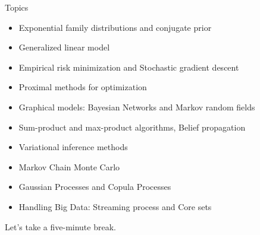 \documentclass{beamer}
\begin{document}


\begin{frame}{Topics}
\begin{itemize}
    \item Exponential family distributions and conjugate prior
    \item Generalized linear model
    \item Empirical risk minimization and Stochastic gradient descent 
    \item Proximal methods for optimization
    \item Graphical models: Bayesian Networks and Markov random fields
    \item Sum-product and max-product algorithms, Belief propagation
    \item Variational inference methods
    \item Markov Chain Monte Carlo
    \item Gaussian Processes and Copula Processes
    \item Handling Big Data: Streaming process and Core sets
\end{itemize}
\end{frame}




\begin{frame}{}
\begin{center}
Let's take a five-minute break.
\end{center}
\end{frame}
\end{document}
